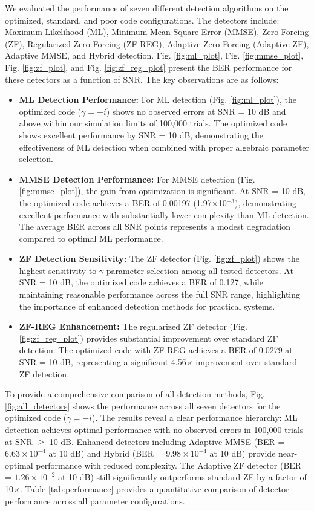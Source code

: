 We evaluated the performance of seven different detection algorithms on the optimized, standard, and poor code configurations. The detectors include: Maximum Likelihood (ML), Minimum Mean Square Error (MMSE), Zero Forcing (ZF), Regularized Zero Forcing (ZF-REG), Adaptive Zero Forcing (Adaptive ZF), Adaptive MMSE, and Hybrid detection. Fig. \ref{fig:ml_plot}, Fig. \ref{fig:mmse_plot}, Fig. \ref{fig:zf_plot}, and Fig. \ref{fig:zf_reg_plot} present the BER performance for these detectors as a function of SNR. The key observations are as follows:
\begin{itemize}
    \item \textbf{ML Detection Performance:} For ML detection (Fig. \ref{fig:ml_plot}), the optimized code (\(\gamma = -i\)) shows no observed errors at SNR = 10 dB and above within our simulation limits of 100,000 trials. The optimized code shows excellent performance by SNR = 10 dB, demonstrating the effectiveness of ML detection when combined with proper algebraic parameter selection.
    
    \item \textbf{MMSE Detection Performance:} For MMSE detection (Fig. \ref{fig:mmse_plot}), the gain from optimization is significant. At SNR = 10 dB, the optimized code achieves a BER of 0.00197 (1.97$\times$10$^{-3}$), demonstrating excellent performance with substantially lower complexity than ML detection. The average BER across all SNR points represents a modest degradation compared to optimal ML performance.
    
    \item \textbf{ZF Detection Sensitivity:} The ZF detector (Fig. \ref{fig:zf_plot}) shows the highest sensitivity to \(\gamma\) parameter selection among all tested detectors. At SNR = 10 dB, the optimized code achieves a BER of 0.127, while maintaining reasonable performance across the full SNR range, highlighting the importance of enhanced detection methods for practical systems.
    
    \item \textbf{ZF-REG Enhancement:} The regularized ZF detector (Fig. \ref{fig:zf_reg_plot}) provides substantial improvement over standard ZF detection. The optimized code with ZF-REG achieves a BER of 0.0279 at SNR = 10 dB, representing a significant 4.56$\times$ improvement over standard ZF detection.
\end{itemize}

To provide a comprehensive comparison of all detection methods, Fig. \ref{fig:all_detectors} shows the performance across all seven detectors for the optimized code (\(\gamma = -i\)). The results reveal a clear performance hierarchy: ML detection achieves optimal performance with no observed errors in 100,000 trials at SNR $\geq$ 10 dB. Enhanced detectors including Adaptive MMSE (BER = $6.63 \times 10^{-4}$ at 10 dB) and Hybrid (BER = $9.98 \times 10^{-4}$ at 10 dB) provide near-optimal performance with reduced complexity. The Adaptive ZF detector (BER = $1.26 \times 10^{-2}$ at 10 dB) still significantly outperforms standard ZF by a factor of 10$\times$. Table \ref{tab:performance} provides a quantitative comparison of detector performance across all parameter configurations.


